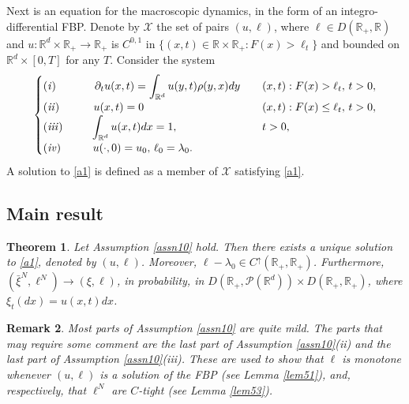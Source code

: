 \documentclass[11pt]{amsart}
\theoremstyle{plain}
\newtheorem{theorem}{Theorem}[section]
\newtheorem{remark}[theorem]{Remark}
\newcommand{\la}{\lambda}
\newcommand{\R}{{\mathbb R}}
\newcommand{\calP}{{\mathcal P}}
\newcommand{\calX}{{\mathcal X}}
\newcommand{\pl}{\partial}
\newcommand{\up}{\uparrow}
\newcommand{\ds}{\displaystyle}
\newcommand{\F}{F}
\begin{document}
Next is an equation for the macroscopic dynamics, in the form of an integro-differential FBP.
Denote by $\calX$ the set of pairs $(u,\ell)$, where $\ell\in D(\R_+,\R)$
and $u:\R^d\times\R_+\to\R_+$ is $C^{0,1}$ in
$\{(x,t)\in\R\times\R_+:\F(x)>\ell_t\}$ and bounded on
$\R^d\times[0,T]$ for any $T$.
Consider the system
\begin{equation}\label{a1}
\begin{cases}\ds
{\it (i)}\hspace{3.5em}
\pl_tu(x,t)=\int_{\R^d}u(y,t)\rho(y,x)dy & \quad (x,t):\F(x)>\ell_t,\,t>0,\\
{\it (ii)}\hspace{3.1em}
u(x,t)=0 & \quad (x,t):\F(x)\le\ell_t,\,t>0, \\
{\it (iii)}\hspace{2.5em}
\ds
\int_{\R^d}u(x,t)dx=1, & \quad t>0, \\
{\it (iv)}\hspace{2.9em}
u(\cdot,0)=u_0,\,\ell_0=\la_0.
\end{cases}
\end{equation}
A solution to \eqref{a1} is defined as a member of $\calX$ satisfying \eqref{a1}.

\subsection{Main result}

\begin{theorem}\label{th3}
Let Assumption \ref{assn10} hold. Then there exists a unique solution
to \eqref{a1}, denoted by $(u,\ell)$. Moreover,
$\ell-\la_0\in C^\up(\R_+,\R_+)$.
Furthermore, $(\bar\xi^N,\ell^N)\to(\xi,\ell)$, in probability,
in $D(\R_+,\calP(\R^d))\times D(\R_+,\R_+)$,
where $\xi_t(dx)=u(x,t )dx$.
\end{theorem}

\begin{remark}
Most parts of Assumption \ref{assn10} are quite mild. The parts that may require some comment are
the last part of Assumption \ref{assn10}(ii) and the last part of Assumption \ref{assn10}(iii). These are used to show that $\ell$ is monotone whenever $(u,\ell)$ is a solution of the FBP (see Lemma \ref{lem51}), and, respectively, that $\ell^N$ are $C$-tight (see Lemma \ref{lem53}).
\end{remark}
\end{document}
